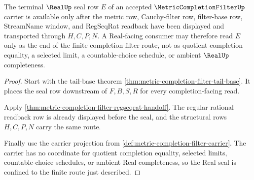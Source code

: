 \begin{theorem}
\label{thm:metric-completion-filter-real-seal-boundary}
The terminal $\RealUp$ seal row $E$ of an accepted $\MetricCompletionFilterUp$ carrier is available only after the metric row, Cauchy-filter row, filter-base row, StreamName window, and RegSeqRat readback have been displayed and transported through $H,C,P,N$. A Real-facing consumer may therefore read $E$ only as the end of the finite completion-filter route, not as quotient completion equality, a selected limit, a countable-choice schedule, or ambient $\RealUp$ completeness.
\end{theorem}
\begin{proof}
Start with the tail-base theorem \autoref{thm:metric-completion-filter-tail-base}. It places the seal row downstream of $F,B,S,R$ for every completion-facing read.

Apply \autoref{thm:metric-completion-filter-regseqrat-handoff}. The regular rational readback row is already displayed before the seal, and the structural rows $H,C,P,N$ carry the same route.

Finally use the carrier projection from \autoref{def:metric-completion-filter-carrier}. The carrier has no coordinate for quotient completion equality, selected limits, countable-choice schedules, or ambient Real completeness, so the Real seal is confined to the finite route just described.
\end{proof}


\begin{closurestatus}{\MetricCompletionFilterUp}
  \theoryclosure{\seedClosure}
  \formalstatus{\unformalizedV}
\end{closurestatus}
